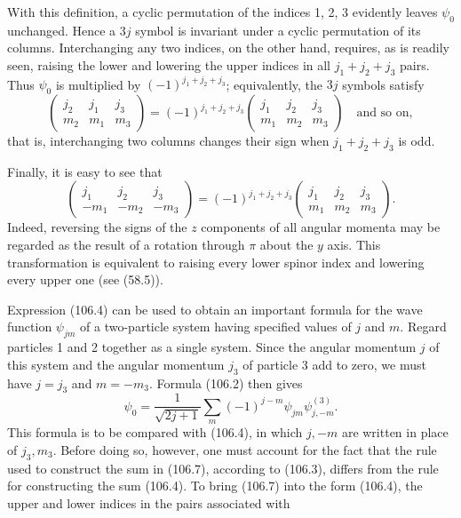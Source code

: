 With this definition, a cyclic permutation of the indices 1, 2, 3 evidently leaves $\psi_0$ unchanged. Hence a $3j$ symbol is invariant under a cyclic permutation of its columns. Interchanging any two indices, on the other hand, requires, as is readily seen, raising the lower and lowering the upper indices in all $j_1+j_2+j_3$ pairs. Thus $\psi_0$ is multiplied by $(-1)^{j_1+j_2+j_3}$; equivalently, the $3j$ symbols satisfy
\begin{equation}
 \begin{pmatrix}j_2&j_1&j_3\\m_2&m_1&m_3\end{pmatrix}
 =(-1)^{j_1+j_2+j_3}\begin{pmatrix}j_1&j_2&j_3\\m_1&m_2&m_3\end{pmatrix}
 \quad\text{and so on},
 \tag{106.5}
\end{equation}
that is, interchanging two columns changes their sign when $j_1+j_2+j_3$ is odd.

Finally, it is easy to see that
\begin{equation}
 \begin{pmatrix}j_1&j_2&j_3\\-m_1&-m_2&-m_3\end{pmatrix}
 =(-1)^{j_1+j_2+j_3}\begin{pmatrix}j_1&j_2&j_3\\m_1&m_2&m_3\end{pmatrix}.
 \tag{106.6}
\end{equation}
Indeed, reversing the signs of the $z$ components of all angular momenta may be regarded as the result of a rotation through $\pi$ about the $y$ axis. This transformation is equivalent to raising every lower spinor index and lowering every upper one (see (58.5)).

Expression (106.4) can be used to obtain an important formula for the wave function $\psi_{jm}$ of a two-particle system having specified values of $j$ and $m$. Regard particles 1 and 2 together as a single system. Since the angular momentum $j$ of this system and the angular momentum $j_3$ of particle 3 add to zero, we must have $j=j_3$ and $m=-m_3$. Formula (106.2) then gives
\begin{equation}
 \psi_0=\frac1{\sqrt{2j+1}}\sum_m(-1)^{j-m}\psi_{jm}\psi^{(3)}_{j,-m}.
 \tag{106.7}
\end{equation}
This formula is to be compared with (106.4), in which $j,-m$ are written in place of $j_3,m_3$. Before doing so, however, one must account for the fact that the rule used to construct the sum in (106.7), according to (106.3), differs from the rule for constructing the sum (106.4). To bring (106.7) into the form (106.4), the upper and lower indices in the pairs associated with

